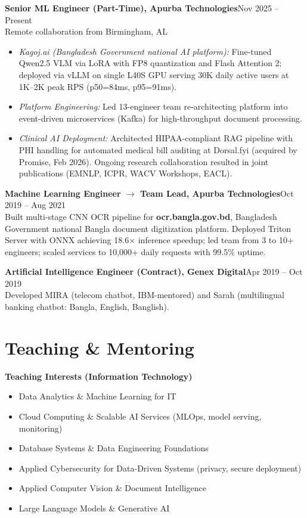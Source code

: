 \documentclass[11pt]{article}
\newcommand{\cventry}[3]{%
  \noindent\textbf{#1}\hfill #2\\
  \noindent #3 \par
}
\begin{document}
\cventry
{Senior ML Engineer (Part-Time), Apurba Technologies}
{Nov 2025 -- Present}
{Remote collaboration from Birmingham, AL
\begin{itemize}
  \item \textit{Kagoj.ai (Bangladesh Government national AI platform):} Fine-tuned Qwen2.5 VLM via LoRA with FP8 quantization and Flash Attention 2; deployed via vLLM on single L40S GPU serving 30K daily active users at 1K--2K peak RPS (p50=84ms, p95=91ms).
  \item \textit{Platform Engineering:} Led 13-engineer team re-architecting platform into event-driven microservices (Kafka) for high-throughput document processing.
  \item \textit{Clinical AI Deployment:} Architected HIPAA-compliant RAG pipeline with PHI handling for automated medical bill auditing at Dorsal.fyi (acquired by Promise, Feb 2026). Ongoing research collaboration resulted in joint publications (EMNLP, ICPR, WACV Workshops, EACL).
\end{itemize}
}

\cventry
{Machine Learning Engineer $\rightarrow$ Team Lead, Apurba Technologies}
{Oct 2019 -- Aug 2021}
{Built multi-stage CNN OCR pipeline for \textbf{ocr.bangla.gov.bd}, Bangladesh Government national Bangla document digitization platform. Deployed Triton Server with ONNX achieving 18.6$\times$ inference speedup; led team from 3 to 10+ engineers; scaled services to 10,000+ daily requests with 99.5\% uptime.}

\cventry
{Artificial Intelligence Engineer (Contract), Genex Digital}
{Apr 2019 -- Oct 2019}
{Developed MIRA (telecom chatbot, IBM-mentored) and Sarah (multilingual banking chatbot: Bangla, English, Banglish).}

\section{Teaching \& Mentoring}
\textbf{Teaching Interests (Information Technology)}
\begin{itemize}[nosep]
  \item Data Analytics \& Machine Learning for IT
  \item Cloud Computing \& Scalable AI Services (MLOps, model serving, monitoring)
  \item Database Systems \& Data Engineering Foundations
  \item Applied Cybersecurity for Data-Driven Systems (privacy, secure deployment)
  \item Applied Computer Vision \& Document Intelligence
  \item Large Language Models \& Generative AI
\end{itemize}
\end{document}
